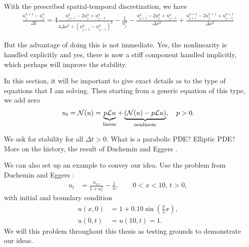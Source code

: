 With the prescribed spatial-temporal discretization, we have 
\begin{align}
\frac{u^{n+1}_j - u^n_j}{\Delta t}
= 4\frac{u^n_{j+1} - 2u^n_j + u^n_{j-1}}{4\Delta x^2 + (u^n_{j+1} - u^n_{j-1})^2}
- \frac{1}{u^n_j} 
- \frac{u^n_{j+1} - 2u^n_j + u^n_{j-1}}{\Delta x^2} 
+ \frac{u^{n+1}_{j+1} - 2u^{n+1}_j + u^{n+1}_{j-1}}{\Delta x^2}
\end{align} 

But the advantage of doing this is not immediate. Yes, the nonlinearity is handled explicitly and yes, there is now a stiff component handled implicitly, which perhaps will improve the stability. 

\newpage
 
In this section, it will be important to give exact details as to the type of equations that I am solving. Then starting from a generic equation of this type, we add zero
\begin{align}
        u_t = \mathcal{N}(u)
= \underbrace{p\mathcal{L} u}_\text{linear} +\underbrace{ (\mathcal{N}(u) - p\mathcal{L} u)}_\text{nonlinear}, 
\quad 
p > 0.
\label{generic}
\end{align}

We ask for stability for all $\Delta t > 0$. What is a parabolic PDE? Elliptic PDE? More on the history, the result of Duchemin and Eggers \cite{duchemin2014explicit}.


We can also set up an example to convey our idea. Use the problem from Duchemin and Eggers \cite{duchemin2014explicit}: 
\begin{align*}
u_t &= \frac{u_{xx}}{1 + u_x^2} - \frac{1}{u}, 
\qquad 0 < x < 10, \, t > 0,
\end{align*}
with initial and boundary condition
\begin{align*}
u(x,0) &= 1 + 0.10\sin\left(\frac{\pi}{5} x \right),
\\
u(0,t) &= u(10,t) = 1.
\end{align*}
We will this problem throughout this thesis as testing grounds to demonstrate our ideas.